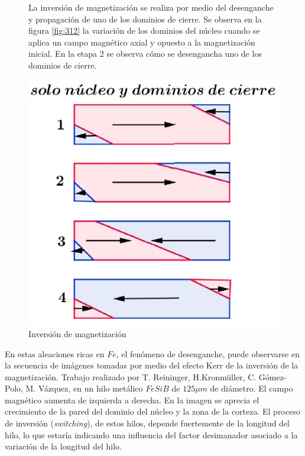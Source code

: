 \begin{figure}[H]
  \begin{minipage}[b]{0.47\textwidth}
  La inversión de magnetización se realiza por medio del desenganche y propagación de uno de los dominios de cierre. Se observa en la figura \ref{fig:312} la variación de los dominios del núcleo cuando se aplica un campo magnético axial y opuesto a la magnetización inicial. En la etapa 2 se observa cómo se desengancha uno de los dominios de cierre.
\vspace{3cm}
  \end{minipage}
  \hfill
  \begin{minipage}[b]{0.47\textwidth}
     \includegraphics[width=1.10\textwidth]{./Figures/fig312}
     \caption{Inversión de magnetización}
	\label{fig:31}
  \end{minipage}
\end{figure}

En estas aleaciones ricas en $Fe$, el fenómeno de desenganche, puede observarse en la secuencia de imágenes tomadas por medio del efecto Kerr de la inversión de la magnetización. Trabajo realizado por T. Reininger, H.Kronmüller, C. Gómez-Polo, M. Vázquez, en un hilo metálico $FeSiB$ de $125\mu m$ de diámetro. El campo magnético aumenta de izquierda a derecha. En la imagen se aprecia el crecimiento de la pared del dominio del núcleo y la zona de la corteza. El proceso de inversión (\textit{switching}), de estos hilos, depende fuertemente de la longitud del hilo, lo que estaría indicando una influencia del factor desimanador asociado a la variación de la longitud del hilo.


